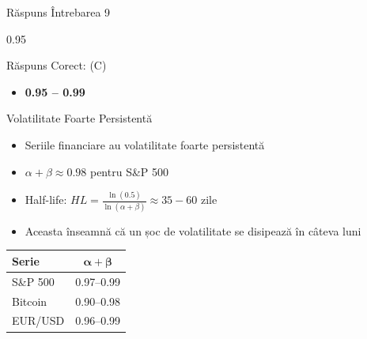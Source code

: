 \documentclass[9pt, aspectratio=169, t]{beamer}
\begin{document}
\begin{frame}{Răspuns Întrebarea 9}
    \begin{cminipage}{0.95\textwidth}
    \begin{exampleblock}{Răspuns Corect: (C)}
        \begin{itemize}\setlength{\itemsep}{0pt}
            \item \textbf{0.95 -- 0.99}
        \end{itemize}
    \end{exampleblock}

    \pause
    \begin{block}{Volatilitate Foarte Persistentă}
        \begin{itemize}\setlength{\itemsep}{0pt}
            \item Seriile financiare au volatilitate foarte persistentă
            \item $\alpha + \beta \approx 0.98$ pentru S\&P 500
            \item Half-life: $HL = \frac{\ln(0.5)}{\ln(\alpha + \beta)} \approx 35-60$ zile
            \item Aceasta înseamnă că un șoc de volatilitate se disipează în câteva luni
        \end{itemize}
        \vspace{-1mm}
        {\footnotesize
        \begin{center}
            \begin{tabular}{lc}
                \toprule
                \textbf{Serie} & $\bm{\alpha + \beta}$ \\
                \midrule
                S\&P 500 & 0.97--0.99 \\
                Bitcoin & 0.90--0.98 \\
                EUR/USD & 0.96--0.99 \\
                \bottomrule
            \end{tabular}
        \end{center}
        }
    \end{block}
    \end{cminipage}
\end{frame}
\end{document}

